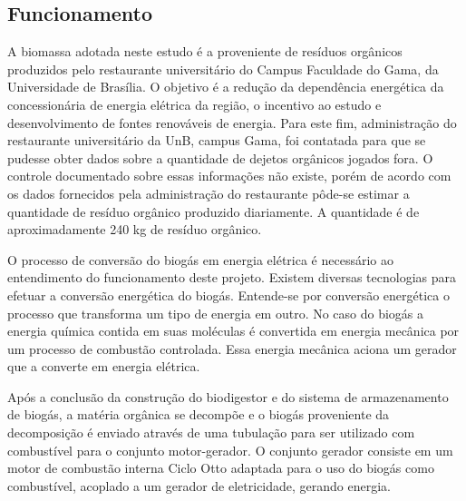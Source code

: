 \subsection {Funcionamento}
A biomassa adotada neste estudo é a proveniente de resíduos orgânicos produzidos pelo restaurante universitário do Campus Faculdade do Gama, da Universidade de Brasília. O objetivo é a redução da dependência energética da concessionária de energia elétrica da região, o incentivo ao estudo e desenvolvimento de fontes renováveis de energia.
Para este fim, administração do restaurante universitário da UnB, campus Gama, foi contatada para que se pudesse obter dados sobre a quantidade de dejetos orgânicos jogados fora. O controle documentado sobre essas informações não existe, porém de acordo com os dados fornecidos pela administração do restaurante pôde-se estimar a quantidade de resíduo orgânico produzido diariamente. A quantidade é de aproximadamente 240 kg de resíduo orgânico.
\par O processo de conversão do biogás em energia elétrica é necessário ao entendimento do funcionamento deste projeto. Existem diversas tecnologias para efetuar a conversão energética do biogás. Entende-se por conversão energética o processo que transforma um tipo de energia em outro. No caso do biogás a energia química contida em suas moléculas é convertida em energia mecânica por um processo de combustão controlada. Essa energia mecânica aciona um gerador que a converte em energia elétrica.
\par Após a conclusão da construção do biodigestor e do sistema de armazenamento de biogás, a matéria orgânica se decompõe e o biogás proveniente da decomposição é enviado através de uma tubulação para ser utilizado com combustível para o conjunto motor-gerador. O conjunto gerador consiste em um motor de combustão interna Ciclo Otto adaptada para o uso do biogás como combustível, acoplado a um gerador de eletricidade, gerando energia.
